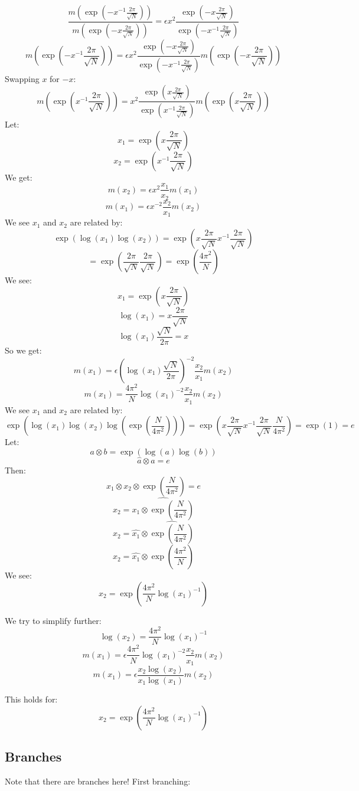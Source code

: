 \documentclass[a4paper]{amsart}
\begin{document}
$$\frac{m(\exp\left(-x^{-1}\frac{2\pi}{\sqrt{N}}\right))}{m(\exp\left(-x\frac{2\pi}{\sqrt{N}}\right))} = \epsilon x^2 \frac{\exp\left(-x\frac{2\pi}{\sqrt{N}}\right)}{\exp\left(-x^{-1}\frac{2\pi}{\sqrt{N}}\right)}$$
$$m\left(\exp\left(-x^{-1}\frac{2\pi}{\sqrt{N}}\right)\right) = \epsilon x^2 \frac{\exp\left(-x\frac{2\pi}{\sqrt{N}}\right)}{\exp\left(-x^{-1}\frac{2\pi}{\sqrt{N}}\right)}m\left(\exp\left(-x\frac{2\pi}{\sqrt{N}}\right)\right)$$
Swapping $x$ for $-x$:
$$m\left(\exp\left(x^{-1}\frac{2\pi}{\sqrt{N}}\right)\right) = x^2 \frac{\exp\left(x\frac{2\pi}{\sqrt{N}}\right)}{\exp\left(x^{-1}\frac{2\pi}{\sqrt{N}}\right)}m\left(\exp\left(x\frac{2\pi}{\sqrt{N}}\right)\right)$$
Let:
$$x_1 = \exp\left(x\frac{2\pi}{\sqrt{N}}\right)$$
$$x_2 = \exp\left(x^{-1}\frac{2\pi}{\sqrt{N}}\right)$$
We get:
$$m(x_2) = \epsilon x^2 \frac{x_1}{x_2}m(x_1)$$
$$m(x_1) = \epsilon x^{-2} \frac{x_2}{x_1}m(x_2)$$
We see $x_1$ and $x_2$ are related by:
$$\exp(\log(x_1)\log(x_2)) = \exp(x\frac{2\pi}{\sqrt{N}}x^{-1}\frac{2\pi}{\sqrt{N}})$$
$$ = \exp(\frac{2\pi}{\sqrt{N}}\frac{2\pi}{\sqrt{N}}) = \exp\left(\frac{4\pi^2}{N}\right)$$
We see: 
$$x_1 = \exp\left(x\frac{2\pi}{\sqrt{N}}\right)$$
$$\log(x_1) = x\frac{2\pi}{\sqrt{N}}$$
$$\log(x_1)\frac{\sqrt{N}}{2\pi} = x$$
So we get:
$$m(x_1) = \epsilon (\log(x_1)\frac{\sqrt{N}}{2\pi})^{-2} \frac{x_2}{x_1}m(x_2)$$
$$m(x_1) = \frac{4\pi^2}{N}\log(x_1)^{-2} \frac{x_2}{x_1}m(x_2)$$
We see $x_1$ and $x_2$ are related by:
$$\exp(\log(x_1)\log(x_2)\log(\exp(\frac{N}{4\pi^2}))) = \exp(x\frac{2\pi}{\sqrt{N}}x^{-1}\frac{2\pi}{\sqrt{N}}\frac{N}{4\pi^2}) = \exp(1) = e$$
Let: 
$$a \otimes b = \exp(\log(a)\log(b))$$
$$\hat{a} \otimes a = e$$
Then: 
$$x_1 \otimes x_2 \otimes \exp(\frac{N}{4\pi^2}) = e$$
$$x_2 = \widehat{x_1 \otimes \exp(\frac{N}{4\pi^2})}$$
$$x_2 = \hat{x_1} \otimes \widehat{\exp(\frac{N}{4\pi^2})}$$
$$x_2 = \hat{x_1} \otimes \exp\left(\frac{4\pi^2}{N}\right)$$
We see:
$$x_2 = \exp(\frac{4\pi^2}{N}\log(x_1)^{-1})$$

We try to simplify further:
$$\log(x_2) = \frac{4\pi^2}{N}\log(x_1)^{-1}$$
$$m(x_1) = \epsilon \frac{4\pi^2}{N}\log(x_1)^{-2} \frac{x_2}{x_1}m(x_2)$$
$$m(x_1) = \epsilon\frac{x_2\log(x_2)}{x_1\log(x_1)}m(x_2)$$

This holds for: 
$$x_2 = \exp(\frac{4\pi^2}{N}\log(x_1)^{-1})$$

\subsection{Branches}

Note that there are branches here! First branching:
\end{document}
